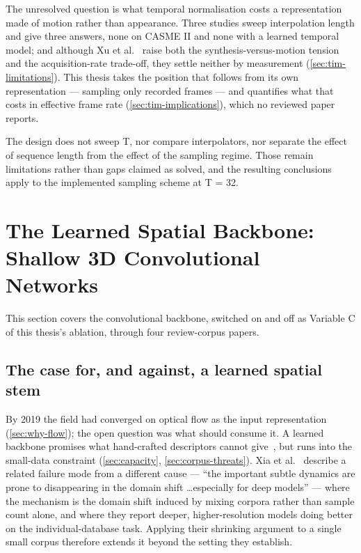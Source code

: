 The unresolved question is what temporal normalisation costs a representation made of motion rather than appearance. Three studies sweep interpolation length and give three answers, none on CASME II and none with a learned temporal model; and although Xu et al.~\cite{xu2017} raise both the synthesis-versus-motion tension and the acquisition-rate trade-off, they settle neither by measurement (\autoref{sec:tim-limitations}). This thesis takes the position that follows from its own representation --- sampling only recorded frames --- and quantifies what that costs in effective frame rate (\autoref{sec:tim-implications}), which no reviewed paper reports.

The design does not sweep T, nor compare interpolators, nor separate the effect of sequence length from the effect of the sampling regime. Those remain limitations rather than gaps claimed as solved, and the resulting conclusions apply to the implemented sampling scheme at T = 32.


\section{The Learned Spatial Backbone: Shallow 3D Convolutional Networks}
\label{sec:cnn-review}

This section covers the convolutional backbone, switched on and off as Variable C of this thesis's ablation, through four review-corpus papers.

\subsection{The case for, and against, a learned spatial stem}
\label{sec:cnn-case}

By 2019 the field had converged on optical flow as the input representation (\autoref{sec:why-flow}); the open question was what should consume it. A learned backbone promises what hand-crafted descriptors cannot give~\cite{liong2019b}, but runs into the small-data constraint (\autoref{sec:capacity}, \autoref{sec:corpus-threats}). Xia et al.~\cite{xia2020b} describe a related failure mode from a different cause --- ``the important subtle dynamics are prone to disappearing in the domain shift \ldots especially for deep models'' --- where the mechanism is the domain shift induced by mixing corpora rather than sample count alone, and where they report deeper, higher-resolution models doing better on the individual-database task. Applying their shrinking argument to a single small corpus therefore extends it beyond the setting they establish.

